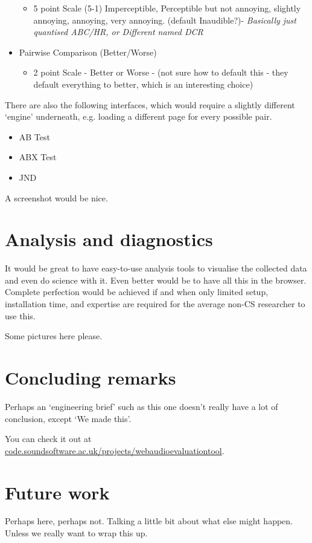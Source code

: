 \documentclass{sig-alternate}
\begin{document}
\begin{itemize}
		\begin{itemize}
			\item 5 point Scale (5-1) Imperceptible, Perceptible but not annoying, slightly annoying, annoying, very annoying. (default Inaudible?)- {\it Basically just quantised ABC/HR, or Different named DCR}
		\end{itemize}
		\item Pairwise Comparison (Better/Worse)~\cite{david1963method}
		\begin{itemize}
			\item 2 point Scale - Better or Worse - (not sure how to default this - they default everything to better, which is an interesting choice)
		\end{itemize}
	\end{itemize}
	
	There are also the following interfaces, which would require a slightly different `engine' underneath, e.g. loading a different page for every possible pair. 
	\begin{itemize}
		\item AB Test~\cite{lipshitz1981great}
		\item ABX Test~\cite{clark1982high}
		\item JND
	\end{itemize}
	
	A screenshot would be nice. 

\section{Analysis and diagnostics}
	It would be great to have easy-to-use analysis tools to visualise the collected data and even do science with it. Even better would be to have all this in the browser. Complete perfection would be achieved if and when only limited setup, installation time, and expertise are required for the average non-CS researcher to use this. 
	
	Some pictures here please. 

\section{Concluding remarks}
	Perhaps an `engineering brief' such as this one doesn't really have a lot of conclusion, except `We made this'. 
	
	You can check it out at \url{code.soundsoftware.ac.uk/projects/webaudioevaluationtool}. 
	
\section{Future work}
	Perhaps here, perhaps not. Talking a little bit about what else might happen. Unless we really want to wrap this up. 

%

%
%
\end{document}
